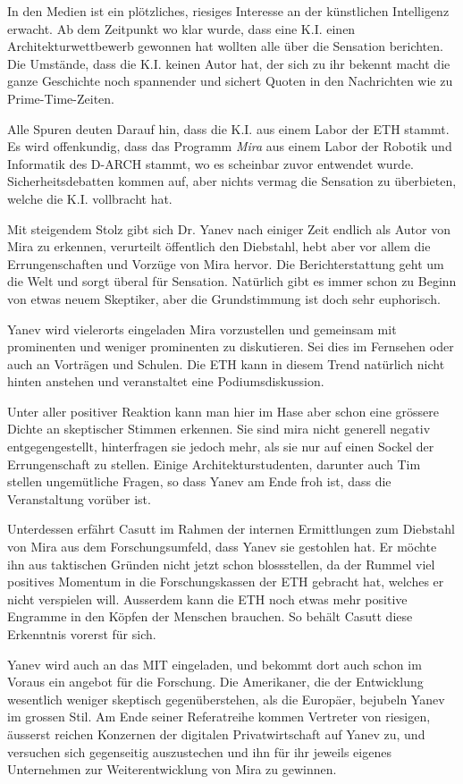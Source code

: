 \documentclass[11pt,a4paper,ngerman]{scrreprt}
\begin{document}
In den Medien ist ein plötzliches, riesiges Interesse an der künstlichen
Intelligenz erwacht. Ab dem Zeitpunkt wo klar wurde, dass eine K.I. einen
Architekturwettbewerb gewonnen hat wollten alle über die Sensation
berichten. Die Umstände, dass die K.I. keinen Autor hat, der sich zu ihr bekennt
macht die ganze Geschichte noch spannender und sichert Quoten in den Nachrichten
wie zu Prime-Time-Zeiten.

Alle Spuren deuten Darauf hin, dass die K.I. aus einem Labor der ETH stammt. Es
wird offenkundig, dass das Programm \emph{Mira} aus einem Labor der Robotik und
Informatik des D-ARCH stammt, wo es scheinbar zuvor entwendet
wurde. Sicherheitsdebatten kommen auf, aber nichts vermag die Sensation zu
überbieten, welche die K.I. vollbracht hat.

Mit steigendem Stolz gibt sich Dr. Yanev nach einiger Zeit endlich als Autor von
Mira zu erkennen, verurteilt öffentlich den Diebstahl, hebt aber vor allem die
Errungenschaften und Vorzüge von Mira hervor. Die Berichterstattung geht um die
Welt und sorgt überal für Sensation. Natürlich gibt es immer schon zu Beginn von
etwas neuem Skeptiker, aber die Grundstimmung ist doch sehr euphorisch.

Yanev wird vielerorts eingeladen Mira vorzustellen und gemeinsam mit prominenten
und weniger prominenten zu diskutieren. Sei dies im Fernsehen oder auch an
Vorträgen und Schulen. Die ETH kann in diesem Trend natürlich nicht hinten
anstehen und veranstaltet eine Podiumsdiskussion.

Unter aller positiver Reaktion kann man hier im Hase aber schon eine grössere
Dichte an skeptischer Stimmen erkennen. Sie sind mira nicht generell negativ
entgegengestellt, hinterfragen sie jedoch mehr, als sie nur auf einen Sockel der
Errungenschaft zu stellen. Einige Architekturstudenten, darunter auch Tim
stellen ungemütliche Fragen, so dass Yanev am Ende froh ist, dass die
Veranstaltung vorüber ist.

Unterdessen erfährt Casutt im Rahmen der internen Ermittlungen zum Diebstahl
von Mira aus dem Forschungsumfeld, dass Yanev sie gestohlen hat. Er möchte ihn
aus taktischen Gründen nicht jetzt schon blossstellen, da der Rummel viel
positives Momentum in die Forschungskassen der ETH gebracht hat, welches er
nicht verspielen will. Ausserdem kann die ETH noch etwas mehr positive Engramme
in den Köpfen der Menschen brauchen. So behält Casutt diese Erkenntnis vorerst
für sich.

Yanev wird auch an das MIT eingeladen, und bekommt dort auch schon im Voraus ein
angebot für die Forschung. Die Amerikaner, die der Entwicklung wesentlich
weniger skeptisch gegenüberstehen, als die Europäer, bejubeln Yanev im grossen
Stil. Am Ende seiner Referatreihe kommen Vertreter von riesigen, äusserst
reichen Konzernen der digitalen Privatwirtschaft auf Yanev zu, und versuchen
sich gegenseitig auszustechen und ihn für ihr jeweils eigenes Unternehmen zur
Weiterentwicklung von Mira zu gewinnen.
\end{document}
